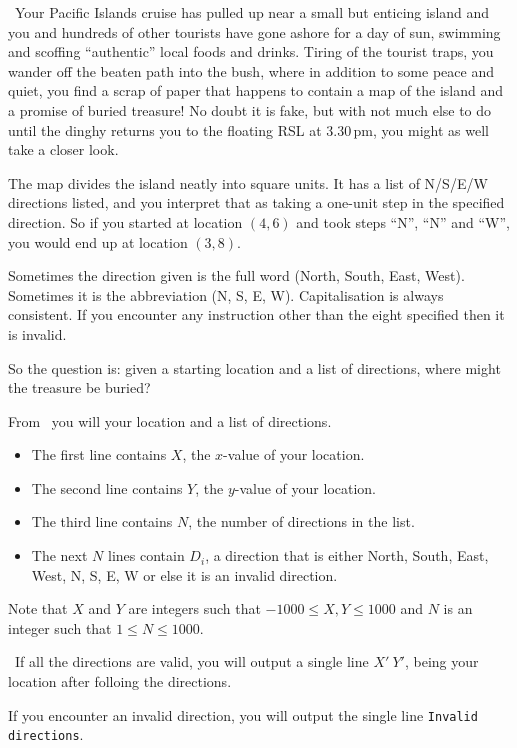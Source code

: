 

\Question\ Your Pacific Islands cruise has pulled up near a small but enticing island and
you and hundreds of other tourists have gone ashore for a day of sun, swimming and
scoffing ``authentic'' local foods and drinks. Tiring of the tourist traps, you wander off
the beaten path into the bush, where in addition to some peace and quiet, you find a scrap
of paper that happens to contain a map of the island and a promise of buried treasure! No
doubt it is fake, but with not much else to do until the dinghy returns you to the
floating RSL at 3.30\,pm, you might as well take a closer look.

The map divides the island neatly into square units. It has a list of N/S/E/W directions
listed, and you interpret that as taking a one-unit step in the specified direction.
So if you started at location $(4,6)$ and took steps ``N'', ``N'' and ``W'', you would end
up at location $(3,8)$.

Sometimes the direction given is the full word (North, South, East, West). Sometimes it is
the abbreviation (N, S, E, W). Capitalisation is always consistent. If you encounter any
instruction other than the eight specified then it is invalid.

So the question is: given a starting location and a list of directions, where might the
treasure be buried?

\Input From \IN\ you will your location and a list of directions.

\begin{itemize}
  \item The first line contains $X$, the $x$-value of your location.
  \item The second line contains $Y$, the $y$-value of your location.
  \item The third line contains $N$, the number of directions in the list.
  \item The next $N$ lines contain $D_i$, a direction that is either North, South, East,
    West, N, S, E, W or else it is an invalid direction.
\end{itemize}

Note that $X$ and $Y$ are integers such that $-1000 \le X,Y \le 1000$ and $N$ is an integer
such that $1 \le N \le 1000$.

\Output\ If all the directions are valid, you will output a single line $X'\ Y'$, being
your location after folloing the directions.

If you encounter an invalid direction, you will output the single line \texttt{Invalid
directions}.

